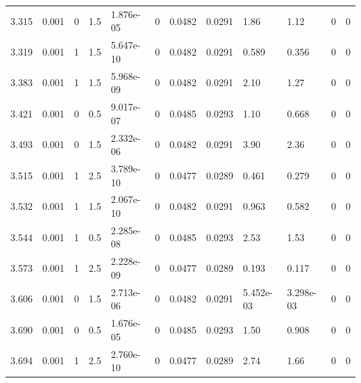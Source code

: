 \documentclass[preview]{standalone}
\begin{document}
{{{\begin{tabular}{L{1.2cm}C{1.2cm} C{0.3cm}C{0.5cm} C{1.4cm}C{1.4cm} C{1.4cm}C{1.4cm} C{1.6cm}C{1.6cm} C{1.6cm}C{1.6cm}}
  3.315  &  0.001  & 0     & 1.5 &  1.876e-05  & 0  &  0.0482&   0.0291& 1.86 & 1.12   &  0 & 0  \\ 
  3.319  &  0.001  & 1     & 1.5 &  5.647e-10  & 0  &  0.0482&   0.0291& 0.589 & 0.356   &  0 & 0  \\ 
  3.383  &  0.001  & 1     & 1.5 &  5.968e-09  & 0  &  0.0482&   0.0291& 2.10 & 1.27   &  0 & 0  \\ 
  3.421  &  0.001  & 0     & 0.5 &  9.017e-07  & 0  &  0.0485&   0.0293& 1.10 & 0.668   &  0 & 0  \\ 
  3.493  &  0.001  & 0     & 1.5 &  2.332e-06  & 0  &  0.0482&   0.0291& 3.90 & 2.36   &  0 & 0  \\ 
  3.515  &  0.001  & 1     & 2.5 &  3.789e-10  & 0  &  0.0477&   0.0289& 0.461 & 0.279   &  0 & 0  \\ 
  3.532  &  0.001  & 1     & 1.5 &  2.067e-10  & 0  &  0.0482&   0.0291& 0.963 & 0.582   &  0 & 0  \\ 
  3.544  &  0.001  & 1     & 0.5 &  2.285e-08  & 0  &  0.0485&   0.0293& 2.53 & 1.53   &  0 & 0  \\ 
  3.573  &  0.001  & 1     & 2.5 &  2.228e-09  & 0  &  0.0477&   0.0289& 0.193 & 0.117   &  0 & 0  \\ 
  3.606  &  0.001  & 0     & 1.5 &  2.713e-06  & 0  &  0.0482&   0.0291& 5.452e-03 & 3.298e-03   &  0 & 0  \\ 
  3.690  &  0.001  & 0     & 0.5 &  1.676e-05  & 0  &  0.0485&   0.0293& 1.50 & 0.908   &  0 & 0  \\ 
  3.694  &  0.001  & 1     & 2.5 &  2.760e-10  & 0  &  0.0477&   0.0289& 2.74 & 1.66   &  0 & 0  \\ 
\hline 
\end{tabular} 

}}}
\end{document}
